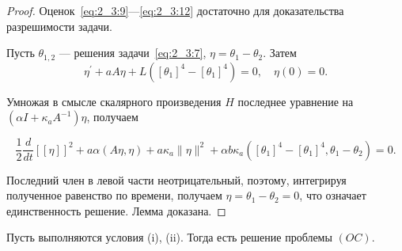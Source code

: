 \begin{proof}
    Оценок~\eqref{eq:2_3:9}—\eqref{eq:2_3:12} достаточно
    для доказательства разрешимости задачи.

    Пусть $\theta_{1,2}$ — решения задачи~\eqref{eq:2_3:7},
    $\eta=\theta_{1}-\theta_{2}$.
    Затем
    \[
        \eta^{\prime}+a A \eta+L\left(\left[\theta_{1}\right]^{4}-
        \left[\theta_{1}\right]^{4}\right)=0, \quad \eta(0)=0.
    \]


    Умножая в смысле скалярного произведения $H$ последнее уравнение на
    $\left(\alpha I+\kappa_{a} A^{-1}\right) \eta$, получаем

    \[
        \frac{1}{2} \frac{d}{d t}[[\eta]]^{2}+a \alpha(A \eta, \eta)
        + a \kappa_{a}\|\eta\|^{2}+\alpha b
        \kappa_{a}\left(\left[\theta_{1}\right]^{4}
        -\left[\theta_{1}\right]^{4}, \theta_{1}-\theta_{2}\right) = 0.
    \]


    Последний член в левой части неотрицательный,
    поэтому, интегрируя полученное равенство по времени,
    получаем $\eta=\theta_{1}-\theta_{2}=0$, что означает единственность решение.
    Лемма доказана.
\end{proof}

\begin{theorem}
    \label{th:2_3:1}
    Пусть выполняются условия (i), (ii).
    Тогда есть решение проблемы $(OC)$.
\end{theorem}



